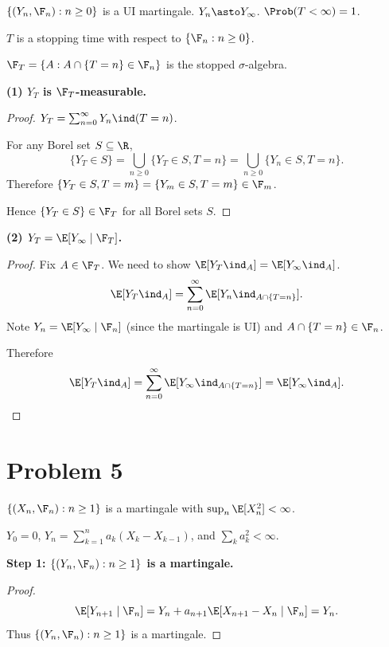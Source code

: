 $\{(Y_n, \F_n) : n \geq 0\}$ is a UI martingale. $Y_n \asto Y_\infty$. $\Prob(T < \infty) = 1$.

$T$ is a stopping time with respect to $\{\F_n : n \geq 0\}$.

$\F_T = \{A : A \cap \{T = n\} \in \F_n\}$ is the stopped $\sigma$-algebra.

\textbf{(1) $Y_T$ is $\F_T$-measurable.}

\begin{proof}
    $Y_T = \sum_{n=0}^{\infty} Y_n \ind(T = n)$.

    For any Borel set $S \subseteq \R$,
    \[
        \{Y_T \in S\} = \bigcup_{n \geq 0} \{Y_T \in S, T = n\} = \bigcup_{n \geq 0} \{Y_n \in S, T = n\}.
    \]
    Therefore $\{Y_T \in S, T = m\} = \{Y_m \in S, T = m\} \in \F_m$.

    Hence $\{Y_T \in S\} \in \F_T$ for all Borel sets $S$.
\end{proof}

\textbf{(2) $Y_T = \E[Y_\infty \mid \F_T]$.}

\begin{proof}
    Fix $A \in \F_T$. We need to show $\E[Y_T \ind_A] = \E[Y_\infty \ind_A]$.
    \[
        \E[Y_T \ind_A] = \sum_{n=0}^{\infty} \E[Y_n \ind_{A \cap \{T = n\}}].
    \]
    Note $Y_n = \E[Y_\infty \mid \F_n]$ (since the martingale is UI) and $A \cap \{T = n\} \in \F_n$.

    Therefore
    \[
        \E[Y_T \ind_A] = \sum_{n=0}^{\infty} \E[Y_\infty \ind_{A \cap \{T = n\}}] = \E[Y_\infty \ind_A]. \qedhere
    \]
\end{proof}

\section*{Problem 5}

$\{(X_n, \F_n) : n \geq 1\}$ is a martingale with $\sup_n \E[X_n^2] < \infty$.

$Y_0 = 0$, $Y_n = \sum_{k=1}^{n} a_k (X_k - X_{k-1})$, and $\sum_k a_k^2 < \infty$.

\textbf{Step 1: $\{(Y_n, \F_n) : n \geq 1\}$ is a martingale.}

\begin{proof}
    \[
        \E[Y_{n+1} \mid \F_n] = Y_n + a_{n+1} \E[X_{n+1} - X_n \mid \F_n] = Y_n.
    \]
    Thus $\{(Y_n, \F_n) : n \geq 1\}$ is a martingale.
\end{proof}

